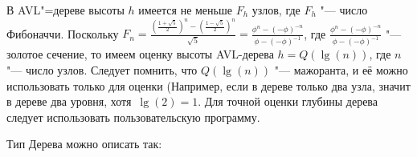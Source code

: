 В AVL"=дереве высоты $h$ имеется не меньше $F_h$ узлов, где $F_h$ "--- число Фибоначчи.
Поскольку $F_n = \frac{(\frac{1 + \sqrt{5}}{2})^n - (\frac{1 - \sqrt{5}}{2})^n}{\sqrt{5}} =
\frac{\phi^n - (-\phi)^{-n}}{\phi - (-\phi)^{-1}}$,
где $\frac{\phi^n - (-\phi)^{-n}}{\phi - (-\phi)^{-1}}$ "--- золотое сечение,
то имеем оценку высоты AVL-дерева $h = Q(\lg(n))$,
где $n$ "--- число узлов. Следует помнить, что $Q(\lg(n))$ "--- мажоранта,
и её можно использовать только для оценки
(Например, если в дереве только два узла, значит в дереве два уровня,
хотя $\lg(2) = 1$. Для точной оценки глубины дерева следует использовать пользовательскую программу.



Тип Дерева можно описать так:

